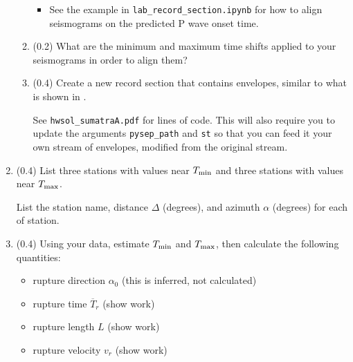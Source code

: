 \documentclass[11pt,titlepage,fleqn]{article}
\begin{document}
\begin{enumerate}
\begin{enumerate}
\begin{itemize}
\item See the example in \verb+lab_record_section.ipynb+ for how to align seismograms on the predicted P wave onset time.
\end{itemize}

\item (0.2) What are the minimum and maximum time shifts applied to your seismograms in order to align them?

\item (0.4) Create a new record section that contains envelopes, similar to what is shown in \citet[][Figure~1d]{Ni2005}.

See \verb+hwsol_sumatraA.pdf+ for lines of code. This will also require you to update the arguments \verb+pysep_path+ and \verb+st+ so that you can feed it your own stream of envelopes, modified from the original stream.

\end{enumerate}


\item (0.4) List three stations with values near $T_{\rm min}$ and three stations with values near $T_{\rm max}$.

List the station name, distance $\Delta$ (degrees), and azimuth $\alpha$ (degrees) for each of station.



\item (0.4) Using your data, estimate $T_{\rm min}$ and $T_{\rm max}$, then calculate the following quantities:
%
\begin{itemize}
\item rupture direction $\alpha_0$ (this is inferred, not calculated)
\item rupture time $\overline{T}_r$ (show work)
\item rupture length $L$ (show work)
\item rupture velocity $v_r$ (show work)
\end{itemize}

\end{enumerate}


\pagebreak
\end{document}

